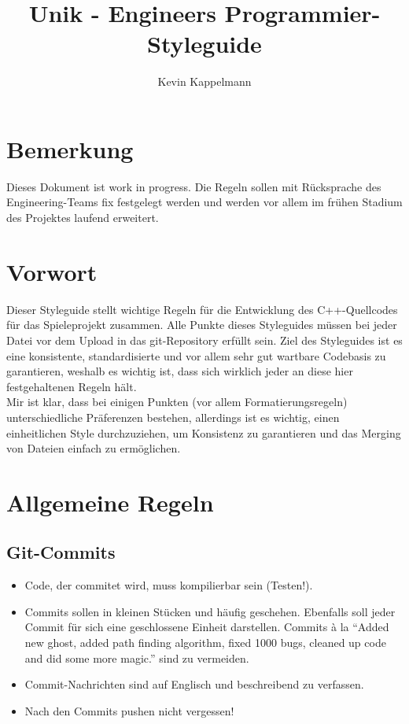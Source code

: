 \documentclass[12pt]{article}
\begin{document}
\title{Unik - Engineers Programmier-Styleguide}%
\author{Kevin Kappelmann}

\maketitle

\section*{Bemerkung}
Dieses Dokument ist work in progress. Die Regeln sollen mit Rücksprache des Engineering-Teams fix festgelegt werden und werden vor allem im frühen Stadium des Projektes laufend erweitert.

\tableofcontents
\newpage

\section{Vorwort}
Dieser Styleguide stellt wichtige Regeln für die Entwicklung des C++-Quellcodes für das Spieleprojekt zusammen. Alle Punkte dieses Styleguides müssen bei jeder Datei vor dem Upload in das git-Repository erfüllt sein. Ziel des Styleguides ist es eine konsistente, standardisierte und vor allem sehr gut wartbare Codebasis zu garantieren, weshalb es wichtig ist, dass sich wirklich jeder an diese hier festgehaltenen Regeln hält.\\
Mir ist klar, dass bei einigen Punkten (vor allem Formatierungsregeln) unterschiedliche Präferenzen bestehen, allerdings ist es wichtig, einen einheitlichen Style durchzuziehen, um Konsistenz zu garantieren und das Merging von Dateien einfach zu ermöglichen.

\section{Allgemeine Regeln}

\subsection{Git-Commits}
\begin{itemize}
	\item Code, der commitet wird, muss kompilierbar sein (Testen!).
	\item Commits sollen in kleinen Stücken und häufig geschehen. Ebenfalls soll jeder Commit für sich eine geschlossene Einheit darstellen. Commits à la ``Added new ghost, added path finding algorithm, fixed 1000 bugs, cleaned up code and did some more magic.'' sind zu vermeiden.
	\item Commit-Nachrichten sind auf Englisch und beschreibend zu verfassen.
	\item Nach den Commits pushen nicht vergessen!
\end{itemize}
\end{document}
